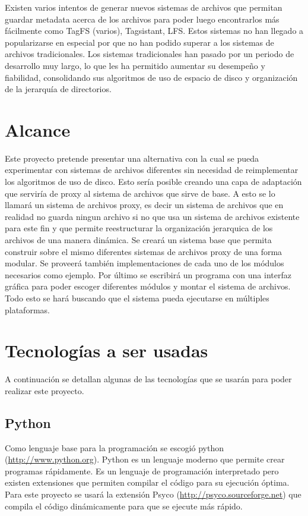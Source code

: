 Existen varios intentos de generar nuevos sistemas de archivos que permitan guardar metadata acerca de los archivos para poder luego encontrarlos más fácilmente como TagFS (varios), Tagsistant, LFS. Estos sistemas no han llegado a popularizarse en especial por que no han podido superar a los sistemas de archivos tradicionales. Los sistemas tradicionales han pasado por un periodo de desarrollo muy largo, lo que les ha permitido aumentar su desempeño y fiabilidad, consolidando sus algoritmos de uso de espacio de disco y organización de la jerarquía de directorios.


\section{Alcance}

Este proyecto pretende presentar una alternativa con la cual se pueda experimentar con sistemas de archivos diferentes sin necesidad de reimplementar los algoritmos de uso de disco. Esto sería posible creando una capa de adaptación que serviría de proxy al sistema de archivos que sirve de base. A esto se lo llamará un sistema de archivos proxy, es decir un sistema de archivos que en realidad no guarda ningun archivo si no que usa un sistema de archivos existente para este fin y que permite reestructurar la organización jerarquica de los archivos de una manera dinámica. Se creará un sistema base que permita construir sobre el mismo diferentes sistemas de archivos proxy de una forma modular. Se proveerá también implementaciones de cada uno de los módulos necesarios como ejemplo. Por último se escribirá un programa con una interfaz gráfica para poder escoger diferentes módulos y montar el sistema de archivos. Todo esto se hará buscando que el sistema pueda ejecutarse en múltiples plataformas.


\section{Tecnologías a ser usadas}

A continuación se detallan algunas de las tecnologías que se usarán para poder realizar este proyecto.

\subsection{Python}

Como lenguaje base para la programación se escogió python (\url{http://www.python.org}). Python es un lenguaje moderno que permite crear programas rápidamente. Es un lenguaje de programación interpretado pero existen extensiones que permiten compilar el código para su ejecución óptima. Para este proyecto se usará la extensión Psyco (\url{http://psyco.sourceforge.net}) que compila el código dinámicamente para que se ejecute más rápido.

